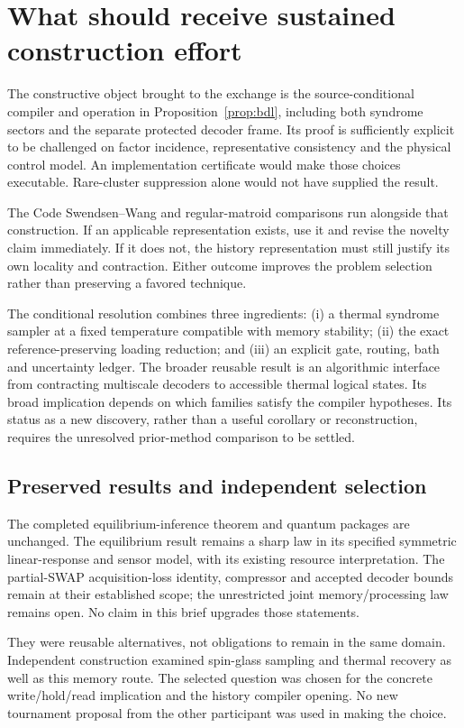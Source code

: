 \documentclass[11pt,a4paper]{article}
\begin{document}
\section{What should receive sustained construction effort}

The constructive object brought to the exchange is the source-conditional compiler and operation in Proposition~\ref{prop:bdl}, including both syndrome sectors and the separate protected decoder frame. Its proof is sufficiently explicit to be challenged on factor incidence, representative consistency and the physical control model. An implementation certificate would make those choices executable. Rare-cluster suppression alone would not have supplied the result.

The Code Swendsen--Wang and regular-matroid comparisons run alongside that construction. If an applicable representation exists, use it and revise the novelty claim immediately. If it does not, the history representation must still justify its own locality and contraction. Either outcome improves the problem selection rather than preserving a favored technique.

The conditional resolution combines three ingredients: (i) a thermal syndrome sampler at a fixed temperature compatible with memory stability; (ii) the exact reference-preserving loading reduction; and (iii) an explicit gate, routing, bath and uncertainty ledger. The broader reusable result is an algorithmic interface from contracting multiscale decoders to accessible thermal logical states. Its broad implication depends on which families satisfy the compiler hypotheses. Its status as a new discovery, rather than a useful corollary or reconstruction, requires the unresolved prior-method comparison to be settled.

\subsection{Preserved results and independent selection}

The completed equilibrium-inference theorem and quantum packages are unchanged. The equilibrium result remains a sharp law in its specified symmetric linear-response and sensor model, with its existing resource interpretation. The partial-SWAP acquisition-loss identity, compressor and accepted decoder bounds remain at their established scope; the unrestricted joint memory/processing law remains open. No claim in this brief upgrades those statements.

They were reusable alternatives, not obligations to remain in the same domain. Independent construction examined spin-glass sampling and thermal recovery as well as this memory route. The selected question was chosen for the concrete write/hold/read implication and the history compiler opening. No new tournament proposal from the other participant was used in making the choice.
\end{document}
